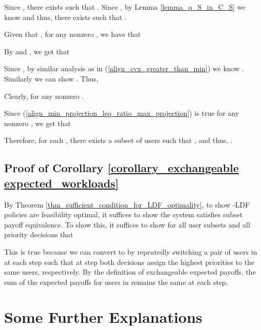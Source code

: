 \documentclass[prodmode,acmtompecs]{acmsmall}
\newcommand{\myComments}[1]{}
\newif\ifdissertation
\newcommand{\dissertationStart}{\ifdissertation  \myComments{Dissertation version: }}
\begin{document}
Since , there exists  such that . Since , by Lemma \ref{lemma_q_S_in_C_S} we know  and thus, there exists  such that . 

Given that , for any nonzero , we have that


By  and , we get that


Since , by similar analysis as in (\ref{align_cvx_greater_than_min}) we know . Similarly we can show . Thus, 

Clearly,  for any nonzero . 

Since (\ref{align_min_projection_leq_ratio_max_projection}) is true for any nonzero , we get that


Therefore, for each , there exists a subset of users  such that , and thus,
. 

\subsection{Proof of Corollary \ref{corollary_exchangeable expected_workloads}}
\label{appendix_pf_corollary_exchangeable expected_workloads}
By Theorem \ref{thm_sufficient_condition_for_LDF_optimality}, to show -LDF policies are feasibility optimal, it suffices to show the system satisfies subset payoff equivalence. To show this, it suffices to show for all user subsets  and all priority decisions  that 


This is true because we can convert  to  by repeatedly switching a pair of users in  at each step such that at step  both decisions assign the highest  priorities to the same users, respectively. By the definition of exchangeable expected payoffs, the sum of the expected payoffs for users in  remains the same at each step. 





\dissertationStart
\appendix
\section{Some Further Explanations}
\end{document}

